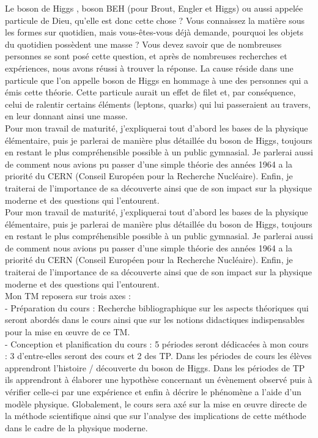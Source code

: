 \documentclass[a4paper,12pt,oneside,openright]{book} %
\begin{document}
Le boson de Higgs \cite{spie} %
, boson BEH (pour Brout, Engler et Higgs) ou aussi appelée particule de Dieu, qu'elle est donc cette chose ? Vous connaissez la mati\`ere sous les formes sur quotidien, mais vous-\^etes-vous d\'ej\`a demande, pourquoi les objets du quotidien poss\`edent une masse ? Vous devez savoir que de nombreuses personnes se sont pos\'e cette question, et apr\`es de nombreuses recherches et exp\'eriences, nous avons r\'eussi \`a trouver la r\'eponse. La cause r\'eside dans une particule que l'on appelle boson de Higgs en hommage \`a une des personnes qui a \'emis cette th\'eorie. Cette particule aurait un effet de filet et, par cons\'equence, celui de ralentir certains \'el\'ements (leptons, quarks) qui lui passeraient au travers, en leur donnant ainsi une masse.\\

Pour mon travail de maturit\'e, j'expliquerai tout d'abord les bases de la physique \'el\'ementaire, puis je parlerai de mani\`ere plus d\'etaill\'ee du boson de Higgs, toujours en restant le plus compr\'ehensible possible \`a un public gymnasial. Je parlerai aussi de comment nous avions pu passer d'une simple th\'eorie des ann\'ees 1964 a la priorit\'e du CERN (Conseil Europ\'een pour la Recherche Nucl\'eaire). Enfin, je traiterai de l'importance de sa d\'ecouverte ainsi que de son impact sur la physique moderne et des questions qui l'entourent.\\

Pour mon travail de maturit\'e, j'expliquerai tout d'abord les bases de la physique \'el\'ementaire, puis je parlerai de mani\`ere plus d\'etaill\'ee du boson de Higgs, toujours en restant le plus compr\'ehensible possible \`a un public gymnasial. Je parlerai aussi de comment nous avions pu passer d'une simple th\'eorie des ann\'ees 1964 a la priorit\'e du CERN (Conseil Europ\'een pour la Recherche Nucl\'eaire). Enfin, je traiterai de l'importance de sa d\'ecouverte ainsi que de son impact sur la physique moderne et des questions qui l'entourent. \\

Mon TM reposera sur trois axes :\\
-	Pr\'eparation du cours : Recherche bibliographique sur les aspects th\'eoriques qui seront abord\'es dans le cours ainsi que sur les notions didactiques indispensables pour la mise en \oe uvre de ce TM.\\

-	Conception et planification du cours : 5 p\'eriodes seront d\'edicac\'ees \`a mon cours : 3 d'entre-elles seront des cours et 2 des TP. Dans les p\'eriodes de cours les \'el\`eves apprendront l'histoire / d\'ecouverte du boson de Higgs. Dans les p\'eriodes de TP ils apprendront \`a \'elaborer une hypoth\`ese concernant un \'ev\`enement observ\'e puis \`a v\'erifier celle-ci par une exp\'erience et enfin \`a d\'ecrire le ph\'enom\`ene a l'aide d'un mod\`ele physique. Globalement, le cours sera ax\'e sur la mise en \oe uvre directe de la m\'ethode scientifique ainsi que sur l'analyse des implications de cette m\'ethode dans le cadre de la physique moderne.\\
\end{document}
